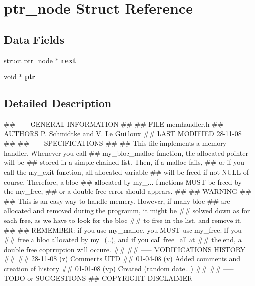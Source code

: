 \hypertarget{structptr__node}{
\section{ptr\_\-node Struct Reference}
\label{structptr__node}
}
\subsection*{Data Fields}
\begin{CompactItemize}
\item 
\hypertarget{structptr__node_ff3a76cac5d9052a20ddeceed0e9b1cf}{
struct \hyperlink{structptr__node}{ptr\_\-node} $\ast$ \textbf{next}}
\label{structptr__node_ff3a76cac5d9052a20ddeceed0e9b1cf}

\item 
\hypertarget{structptr__node_cd388f7d69011add91232e01caeb6a44}{
void $\ast$ \textbf{ptr}}
\label{structptr__node_cd388f7d69011add91232e01caeb6a44}

\end{CompactItemize}


\subsection{Detailed Description}
\#\# ----- GENERAL INFORMATION \#\# \#\# FILE \hyperlink{memhandler_8h_source}{memhandler.h} \#\# AUTHORS P. Schmidtke and V. Le Guilloux \#\# LAST MODIFIED 28-11-08 \#\# \#\# ----- SPECIFICATIONS \#\# \#\# This file implements a memory handler. Whenever you call \#\# my\_\-bloc\_\-malloc function, the allocated pointer will be \#\# stored in a simple chained list. Then, if a malloc fails, \#\# or if you call the my\_\-exit function, all allocated variable \#\# will be freed if not NULL of course. Therefore, a bloc \#\# allocated by my\_\-... functions MUST be freed by the my\_\-free, \#\# or a double free error should appears. \#\# \#\# WARNING \#\# \#\# This is an easy way to handle memory. However, if many bloc \#\# are allocated and removed during the programm, it might be \#\# solwed down as for each free, as we have to look for the bloc \#\# to free in the list, and remove it. \#\# \#\# REMEMBER: if you use my\_\-malloc, you MUST use my\_\-free. If you \#\# free a bloc allocated by my\_\-(..), and if you call free\_\-all at \#\# the end, a double free coprruption will occure. \#\# \#\# ----- MODIFICATIONS HISTORY \#\# \#\# 28-11-08 (v) Comments UTD \#\# 01-04-08 (v) Added comments and creation of history \#\# 01-01-08 (vp) Created (random date...) \#\# \#\# ----- TODO or SUGGESTIONS \#\# COPYRIGHT DISCLAIMER

